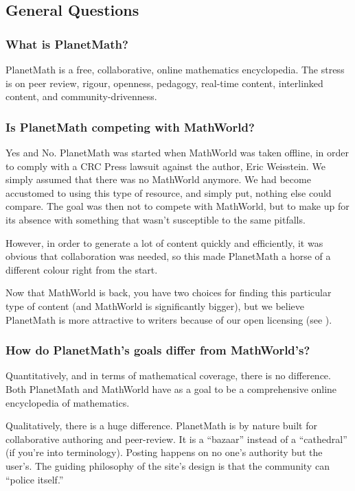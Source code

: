 
\subsection*{General Questions}
\subsubsection*{What is PlanetMath?}
PlanetMath is a free, collaborative, online mathematics encyclopedia. The stress is on peer review, rigour, openness, pedagogy, real-time content, interlinked content, and community-drivenness.

\subsubsection*{Is PlanetMath competing with MathWorld?}
Yes and No.
PlanetMath was started when MathWorld was taken offline, in order to comply with a CRC Press lawsuit against the author, Eric Weisstein. We simply assumed that there was no MathWorld anymore. We had become accustomed to using this type of resource, and simply put, nothing else could compare. The goal was then not to compete with MathWorld, but to make up for its absence with something that wasn't susceptible to the same pitfalls.

However, in order to generate a lot of content quickly and efficiently, it was obvious that collaboration was needed, so this made PlanetMath a horse of a different colour right from the start.

Now that MathWorld is back, you have two choices for finding this particular type of content (and MathWorld is significantly bigger), but we believe PlanetMath is more attractive to writers because of our open licensing (see ).

\subsubsection*{How do PlanetMath's goals differ from MathWorld's?}
Quantitatively, and in terms of mathematical coverage, there is no difference. Both PlanetMath and MathWorld have as a goal to be a comprehensive online encyclopedia of mathematics.

Qualitatively, there is a huge difference. PlanetMath is by nature built for collaborative authoring and peer-review. It is a ``bazaar'' instead of a ``cathedral'' (if you're into  terminology). Posting happens on no one's authority but the user's. The guiding philosophy of the site's design is that the community can ``police itself.''

